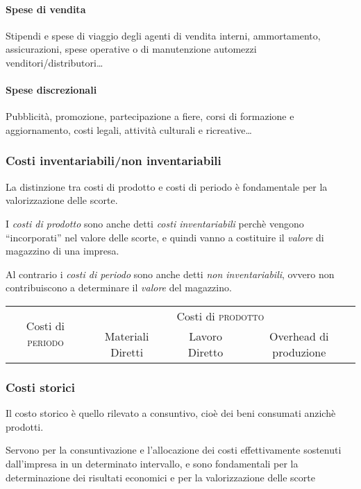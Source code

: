 \paragraph{Spese di vendita}
Stipendi e spese di viaggio degli agenti di
vendita interni, ammortamento, assicurazioni, spese operative o di
manutenzione automezzi venditori/distributori\dots

\paragraph{Spese discrezionali}
Pubblicità, promozione, partecipazione a
fiere, corsi di formazione e aggiornamento, costi legali, attività
culturali e ricreative\dots

\subsubsection{Costi inventariabili/non inventariabili}
La distinzione tra costi di prodotto e costi di periodo è fondamentale
per la valorizzazione delle scorte.

I \emph{costi di prodotto} sono anche detti \emph{costi inventariabili} perchè
vengono ``incorporati'' nel valore delle scorte, e quindi vanno a costituire il
\emph{valore} di magazzino di una impresa.

Al contrario i \emph{costi di periodo} sono anche detti \emph{non inventariabili},
ovvero non contribuiscono a determinare il \emph{valore} del magazzino.

\vspace{1em}
\begin{tabular}{|c|c|c|c|}
    \hline
    \multirow{2}{*}{Costi di \textsc{periodo}} & \multicolumn{3}{c|}{Costi di \textsc{prodotto}}\\
    \cline{2-4}
    & Materiali Diretti & Lavoro Diretto & Overhead di produzione \\
    \hline
\end{tabular}

\subsubsection{Costi storici}
Il costo storico è quello rilevato a consuntivo, cioè dei beni consumati anzichè prodotti.

Servono per la consuntivazione e l’allocazione dei costi effettivamente
sostenuti dall’impresa in un determinato intervallo, e sono fondamentali per la
determinazione dei risultati economici e per la valorizzazione delle scorte

